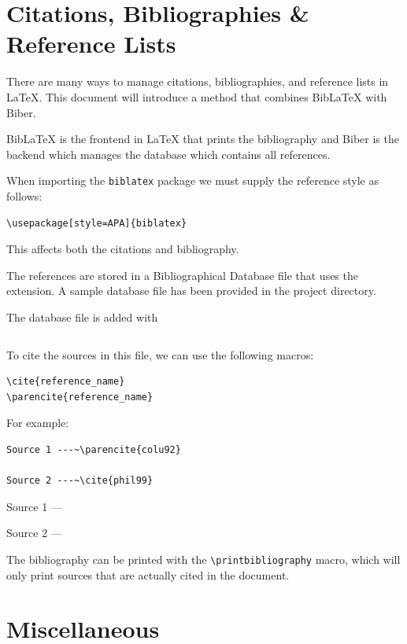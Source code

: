 \documentclass[11pt, twoside]{article}
\begin{document}
\section{Citations, Bibliographies \& Reference Lists}
There are many ways to manage citations, bibliographies, and reference lists in \LaTeX{}. This document will introduce a method that combines BibLaTeX with Biber.

BibLaTeX is the frontend in \LaTeX{} that prints the bibliography and Biber is the backend which manages the database which contains all references.

When importing the \lstinline{biblatex} package we must supply the reference style as follows:
\begin{lstlisting}
\usepackage[style=APA]{biblatex}
\end{lstlisting}
This affects both the citations and bibliography.

The references are stored in a Bibliographical Database file that uses the  extension. A sample database file has been provided in the project directory.

The database file is added with
\begin{lstlisting}

\end{lstlisting}
To cite the sources in this file, we can use the following macros:
\begin{lstlisting}
\cite{reference_name}
\parencite{reference_name}
\end{lstlisting}
For example:
\begin{lstlisting}
Source 1 ---~\parencite{colu92} 

Source 2 ---~\cite{phil99}
\end{lstlisting}
\begin{outputbox}
    Source 1 ---~\parencite{colu92}

    Source 2 ---~\cite{phil99}
\end{outputbox}
The bibliography can be printed with the \lstinline{\printbibliography} macro, which will only print sources that are actually cited in the document.
\newpage
\section{Miscellaneous}
\end{document}
